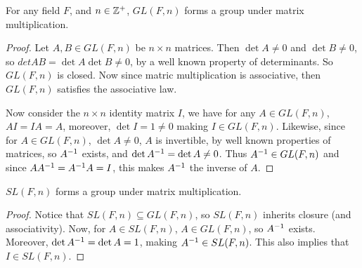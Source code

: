 \begin{theorem}\label{1.5.1}
    For any field $F$, and  $n \in \mathbb{Z}^+$,  $GL(F,n)$ forms a group under matrix
    multiplication.
\end{theorem}
\begin{proof}
    Let $A,B \in GL(F,n)$ be $n \times n$ matrices. Then  $\det{A} \neq 0$ and
    $\det{B} \neq 0$, so $det{AB}=\det{A}\det{B} \neq 0$, by a well known
    property of determinants. So $GL(F,n)$ is closed. Now since matric
    multiplication is associative, then  $GL(F,n)$ satisfies the associative
    law.

    Now consider the $n \times n$ identity matrix $I$, we have for any $A \in
    GL(F,n)$, $AI=IA=A$, moreover,  $\det{I}=1 \neq 0$ making $I \in GL(F,n)$.
    Likewise, since for $A \in GL(F,n)$, $\det{A} \neq 0$, $A$ is invertible, by
    well known properties of matrices, so  $A^{-1}$ exists, and
    $\det{A^{-1}}=\det{A} \neq 0$. Thus $A^{-1} \in GL(F,n)$ and since
    $AA^{-1}=A^{-1}A=I$, this makes $A^{-1}$ the inverse of $A$.
\end{proof}
\begin{corollary}
    $SL(F,n)$ forms a group under matrix multiplication.
\end{corollary}
\begin{proof}
    Notice that $SL(F,n) \subseteq GL(F,n)$, so $SL(F,n)$ inherits closure (and
    associativity). Now, for $A \in SL(F,n)$, $A \in GL(F,n)$, so $A^{-1}$
    exists. Moreover, $\det{A^{-1}}=\det{A}=1$, making $A^{-1} \in SL(F,n)$.
    This also implies that $I \in SL(F,n)$.
\end{proof}

